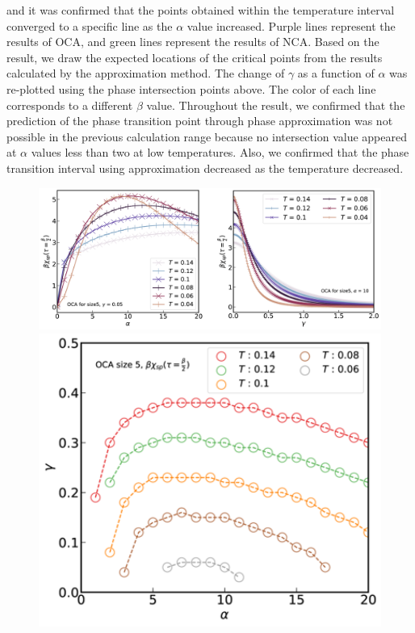 \documentclass{article}[12pt]
\begin{document}
\begin{spacing}{1.5}
and it was confirmed that the points obtained within the temperature interval converged to a specific line as the $\alpha$ value increased. 
Purple lines represent the results of OCA, and green lines represent the results of NCA. 
Based on the result, we draw the expected locations of the critical points from the results calculated by the approximation method. 
The change of $\gamma$ as a function of $\alpha$ was re-plotted using the phase intersection points above. 
The color of each line corresponds to a different $\beta$ value.
Throughout the result, we confirmed that the prediction of the phase transition point through phase approximation was not possible 
in the previous calculation range because no intersection value appeared at $\alpha$ values less than two at low temperatures. 
Also, we confirmed that the phase transition interval using approximation decreased as the temperature decreased.
\pagebreak
\begin{figure}[htbp]
  \centerline{\includegraphics[width=15cm]{TexFigure/4_4_04_crossing.png}}
  \centerline{\includegraphics[width=12cm]{TexFigure/4_4_05_templine.png}}

\end{figure}
\end{spacing}
\end{document}

